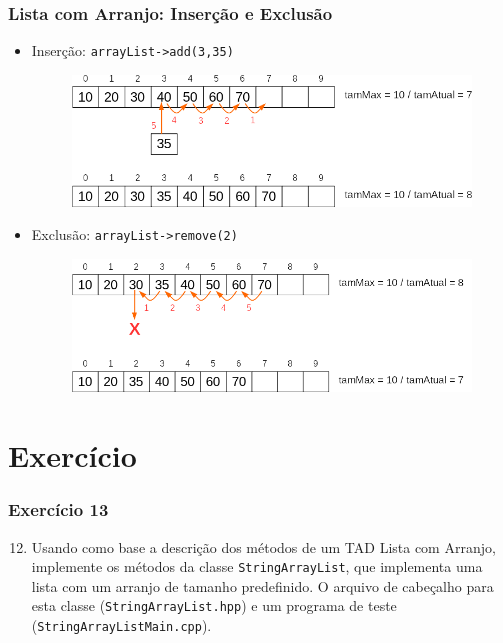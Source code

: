\documentclass[aspectratio=169]{beamer}
\begin{document}
\begin{frame}\frametitle{Lista com Arranjo: Inserção e Exclusão}
\begin{itemize}
	\item Inserção: \texttt{arrayList->add(3,35)}
\begin{figure}[h]
	\centering
	\includegraphics[height=0.30\paperheight]{imagens/lista_com_arranjo_insercao.png}
\end{figure}
	\item Exclusão: \texttt{arrayList->remove(2)}
\begin{figure}[h]
	\centering
	\includegraphics[height=0.30\paperheight]{imagens/lista_com_arranjo_exclusao.png}
\end{figure}
\end{itemize}
\end{frame}

\section{Exercício}

\begin{frame}[fragile]\frametitle{Exercício 13}
\begin{enumerate}
	\setcounter{enumi}{11}
	\item Usando como base a descrição dos métodos de um TAD Lista com Arranjo, implemente os métodos da classe \texttt{StringArrayList}, que implementa uma lista com um arranjo de tamanho predefinido. O arquivo de cabeçalho para esta classe (\texttt{StringArrayList.hpp}) e um programa de teste (\texttt{StringArrayListMain.cpp}).
\end{enumerate}
\end{frame}
\end{document}
